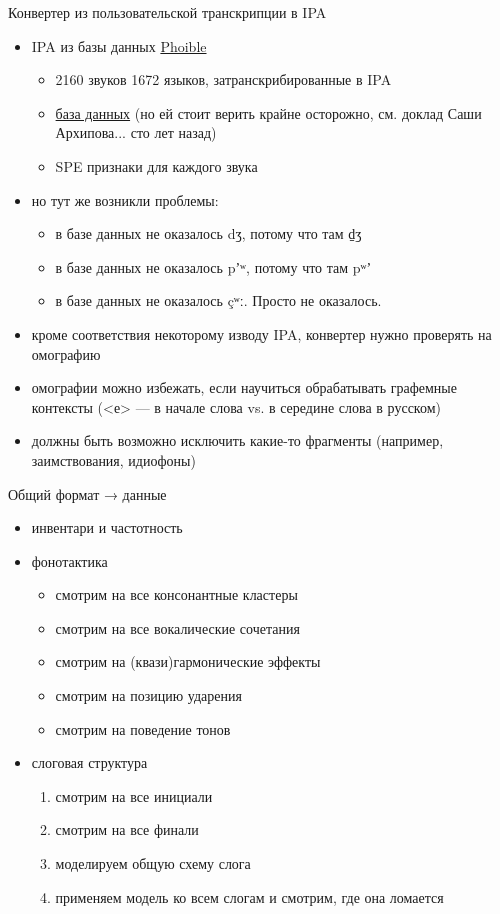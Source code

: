 \documentclass[13pt, t]{beamer}
\begin{document}
\begin{frame}{Конвертер из пользовательской транскрипции в IPA}
\begin{itemize}
\item IPA из базы данных \href{http://phoible.org/}{Phoible}
\begin{itemize}
\item 2160 звуков 1672 языков, затранскрибированные в IPA
\item \href{http://phoible.org/parameters/1AD6D96C35E6ADA62F1EAF5B167F75F7}{база данных} (но ей стоит верить крайне осторожно, см. доклад Саши Архипова... сто лет назад)
\item SPE признаки для каждого звука
\end{itemize}
\item но тут же возникли проблемы: \pause
\begin{itemize}
\item в базе данных не оказалось  {\Large dʒ}\pause, потому что там {\Large d̠ʒ} \pause
\item в базе данных не оказалось  {\Large pʼʷ}\pause, потому что там {\Large pʷʼ} \pause
\item в базе данных не оказалось {\Large çʷː}\pause. Просто не оказалось.
\end{itemize}
\item кроме соответствия некоторому изводу IPA, конвертер нужно проверять на омографию
\item омографии можно избежать, если научиться обрабатывать графемные контексты (<е> --- в начале слова vs. в середине слова в русском) \pause
\item должны быть возможно исключить какие-то фрагменты (например, заимствования, идиофоны)
\end{itemize}
\end{frame}

\begin{frame}{Общий формат → данные}
\begin{itemize}
\item инвентари и частотность
\item фонотактика
\begin{itemize}
\item смотрим на все консонантные кластеры
\item смотрим на все вокалические сочетания
\item смотрим на (квази)гармонические эффекты
\item смотрим на позицию ударения
\item смотрим на поведение тонов
\end{itemize}
\item слоговая структура
\begin{enumerate}
\item смотрим на все инициали
\item смотрим на все финали
\item моделируем общую схему слога
\item применяем модель ко всем слогам и смотрим, где она ломается
\end{enumerate}
\end{itemize}
\end{frame}
\end{document}
